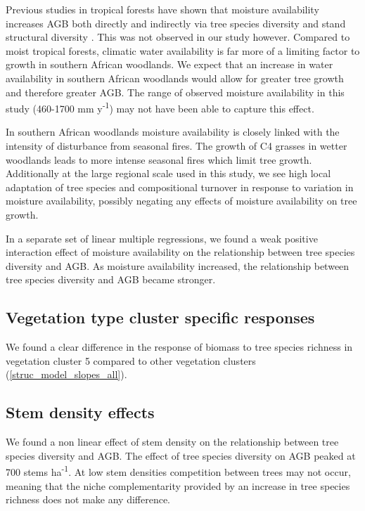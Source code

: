 \documentclass[11pt,a4paper]{article}
\begin{document}
Previous studies in tropical forests have shown that moisture availability increases AGB both directly and indirectly via tree species diversity and stand structural diversity \citep{Ali2019a, Ali2019b, Poorter2017}. This was not observed in our study however. Compared to moist tropical forests, climatic water availability is far more of a limiting factor to growth in southern African woodlands. We expect that an increase in water availability in southern African woodlands would allow for greater tree growth and therefore greater AGB. The range of observed moisture availability in this study (\textapprox{}460-1700 mm y\textsuperscript{-1}) may not have been able to capture this effect. 

In southern African woodlands moisture availability is closely linked with the intensity of disturbance from seasonal fires. The growth of C4 grasses in wetter woodlands leads to more intense seasonal fires which limit tree growth. Additionally at the large regional scale used in this study, we see high local adaptation of tree species and compositional turnover in response to variation in moisture availability, possibly negating any effects of moisture availability on tree growth. 

In a separate set of linear multiple regressions, we found a weak positive interaction effect of moisture availability on the relationship between tree species diversity and AGB. As moisture availability increased, the relationship between tree species diversity and AGB became stronger.  

\subsection{Vegetation type cluster specific responses}

We found a clear difference in the response of biomass to tree species richness in vegetation cluster 5 compared to other vegetation clusters (\autoref{struc_model_slopes_all}).



\subsection{Stem density effects}

We found a non linear effect of stem density on the relationship between tree species diversity and AGB. The effect of tree species diversity on AGB peaked at \textapprox{}700 stems ha\textsuperscript{-1}. At low stem densities competition between trees may not occur, meaning that the niche complementarity provided by an increase in tree species richness does not make any difference. 
\end{document}

